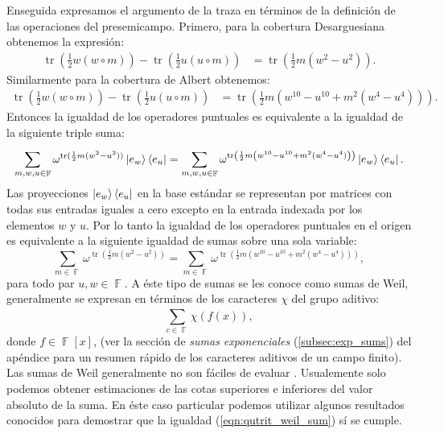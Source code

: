 \documentclass[a4paper, 11pt]{article}
\DeclareMathOperator{\F}{\mathbb{F}}
\DeclareMathOperator{\tr}{tr}
\begin{document}
  Enseguida expresamos el argumento de la traza en términos
  de la definición de las operaciones del presemicampo.
  Primero, para la cobertura Desarguesiana obtenemos la
  expresión:
  \begin{align}
    \tr\left(\frac{1}{2} w(w\circ m)\right)
    - \tr\left(\frac{1}{2} u(u\circ m)\right)
    &= \tr\left(\frac{1}{2} m \left( w^2-u^2 \right)\right).
  \end{align}
  Similarmente para la cobertura de Albert obtenemos:
  \begin{align}
    \tr\left(\frac{1}{2} w(w\circ m)\right)
    - \tr\left(\frac{1}{2} u(u\circ m)\right)
    &= \tr\left( 
      \frac{1}{2} m \left( w^{10} - u^{10}  
      + m^2 \left( w^{4} - u^{4}\right) \right)
    \right). 
  \end{align}
  Entonces la igualdad de los operadores puntuales es
  equivalente a la igualdad de la siguiente triple suma:
  \begin{equation}
    \sum_{m,w,u \in \F}^{}
    \omega^{\tr(\frac{1}{2} m(w^2-u^2))}
    \ket{e_w}\bra{e_u}
    = 
    \sum_{m,w,u \in \F}^{}
    \omega^{\tr\left(\frac{1}{2} m
    \left(w^{10}-u^{10} +  m^2(w^{4}-u^{4})\right) \right)
    }
    \ket{e_w}\bra{e_u}.
  \end{equation}
  Las proyecciones $\ket{e_w}\bra{e_u}$ en la base
  estándar se representan por matrices con todas sus
  entradas iguales a cero excepto en la entrada indexada por
  los elementos $w$ y $u$. Por lo tanto la igualdad de los
  operadores puntuales en el origen es equivalente a la
  siguiente igualdad de sumas sobre una sola variable:
  \begin{equation}
    \label{eqn:qutrit_weil_sum}
    \sum_{m \in \F}^{}
    \omega^{\tr\left( 
        \frac{1}{2} m \left( w^2 - u^2 \right) 
    \right) }
    =
    \sum_{m \in \F}^{} 
    \omega^{\tr\left( 
        \frac{1}{2} m\left( w^{10}-u^{10} + m^2(w^{4}-u^{4})
        \right) 
    \right) },
  \end{equation}
  para todo par $u,w \in \F$. A éste tipo de sumas se les
  conoce como sumas de Weil, generalmente se expresan en
  términos de los caracteres $\chi$ del grupo aditivo:
  \begin{equation}
    \sum_{c \in \F}^{} \chi(f(x)),
  \end{equation}
  donde $f \in \F[x]$, (ver la sección de \textit{sumas
  exponenciales} (\ref{subsec:exp_sums}) del apéndice para
  un resumen rápido de los caracteres aditivos de un campo
  finito). Las sumas de Weil generalmente no son fáciles de
  evaluar \cite{lidl1994}.  Usualemente solo podemos obtener
  estimaciones de las cotas superiores e inferiores del
  valor absoluto de la suma. En éste caso particular podemos
  utilizar algunos resultados conocidos para demostrar que
  la igualdad (\ref{eqn:qutrit_weil_sum}) sí se cumple.
\end{document}
